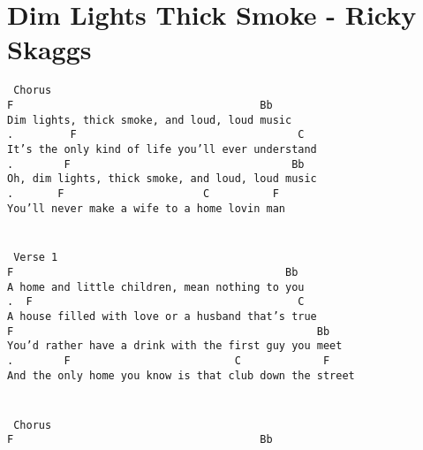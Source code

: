 \newpage
\section{Dim Lights Thick Smoke - Ricky Skaggs}
\label{Dim Lights Thick Smoke - Ricky Skaggs}
\texttt{\lbrack\ Chorus\rbrack\\
F\ \ \ \ \ \ \ \ \ \ \ \ \ \ \ \ \ \ \ \ \ \ \ \ \ \ \ \ \ \ \ \ \ \ \ \ \ \ \ Bb\\
Dim\ lights,\ thick\ smoke,\ and\ loud,\ loud\ music\\
.\ \ \ \ \ \ \ \ \ F\ \ \ \ \ \ \ \ \ \ \ \ \ \ \ \ \ \ \ \ \ \ \ \ \ \ \ \ \ \ \ \ \ \ \ C\\
It's\ the\ only\ kind\ of\ life\ you'll\ ever\ understand\\
.\ \ \ \ \ \ \ \ F\ \ \ \ \ \ \ \ \ \ \ \ \ \ \ \ \ \ \ \ \ \ \ \ \ \ \ \ \ \ \ \ \ \ \ Bb\\
Oh,\ dim\ lights,\ thick\ smoke,\ and\ loud,\ loud\ music\\
.\ \ \ \ \ \ \ F\ \ \ \ \ \ \ \ \ \ \ \ \ \ \ \ \ \ \ \ \ \ C\ \ \ \ \ \ \ \ \ \ F\\
You'll\ never\ make\ a\ wife\ to\ a\ home\ lovin\ man\\
\\
\\
\lbrack\ Verse\ 1\rbrack\\
F\ \ \ \ \ \ \ \ \ \ \ \ \ \ \ \ \ \ \ \ \ \ \ \ \ \ \ \ \ \ \ \ \ \ \ \ \ \ \ \ \ \ \ Bb\\
A\ home\ and\ little\ children,\ mean\ nothing\ to\ you\\
.\ \ F\ \ \ \ \ \ \ \ \ \ \ \ \ \ \ \ \ \ \ \ \ \ \ \ \ \ \ \ \ \ \ \ \ \ \ \ \ \ \ \ \ \ C\\
A\ house\ filled\ with\ love\ or\ a\ husband\ that's\ true\\
F\ \ \ \ \ \ \ \ \ \ \ \ \ \ \ \ \ \ \ \ \ \ \ \ \ \ \ \ \ \ \ \ \ \ \ \ \ \ \ \ \ \ \ \ \ \ \ \ Bb\\
You'd\ rather\ have\ a\ drink\ with\ the\ first\ guy\ you\ meet\\
.\ \ \ \ \ \ \ \ F\ \ \ \ \ \ \ \ \ \ \ \ \ \ \ \ \ \ \ \ \ \ \ \ \ \ C\ \ \ \ \ \ \ \ \ \ \ \ \ F\\
And\ the\ only\ home\ you\ know\ is\ that\ club\ down\ the\ street\\
\\
\\
\lbrack\ Chorus\rbrack\\
F\ \ \ \ \ \ \ \ \ \ \ \ \ \ \ \ \ \ \ \ \ \ \ \ \ \ \ \ \ \ \ \ \ \ \ \ \ \ \ Bb\\
}
